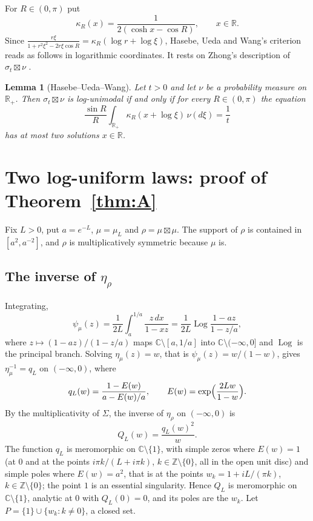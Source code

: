 \documentclass[11pt]{amsart}
\newtheorem{lemma}[theorem]{Lemma}
\theoremstyle{remark}
\newcommand{\R}{\mathbb R}
\newcommand{\C}{\mathbb C}
\newcommand{\Z}{\mathbb Z}
\newcommand{\Rp}{\R_{+}}
\DeclareMathOperator{\Log}{Log}
\begin{document}
For $R\in(0,\pi)$ put
\[
\kappa_R(x)=\frac{1}{2(\cosh x-\cos R)},\qquad x\in\R .
\]
Since $\frac{r\xi}{1+r^2\xi^2-2r\xi\cos R}=\kappa_R(\log r+\log\xi)$, Hasebe, Ueda and Wang's criterion \cite[Lemma~4.1, (1)$\Leftrightarrow$(3)]{HUW} reads as follows in logarithmic coordinates. It rests on Zhong's description of $\sigma_t\boxtimes\nu$ \cite{Zho15}.

\begin{lemma}[Hasebe--Ueda--Wang]\label{lem:huw}
Let $t>0$ and let $\nu$ be a probability measure on $\Rp$. Then $\sigma_t\boxtimes\nu$ is log-unimodal if and only if for every $R\in(0,\pi)$ the equation
\begin{equation}\label{eq:huw}
\frac{\sin R}{R}\int_{\Rp}\kappa_R(x+\log\xi)\,\nu(d\xi)=\frac1t
\end{equation}
has at most two solutions $x\in\R$.
\end{lemma}

\section{Two log-uniform laws: proof of \texorpdfstring{Theorem~\ref{thm:A}}{Theorem A}}\label{sec:A}

Fix $L>0$, put $a=e^{-L}$, $\mu=\mu_L$ and $\rho=\mu\boxtimes\mu$. The support of $\rho$ is contained in $[a^2,a^{-2}]$, and $\rho$ is multiplicatively symmetric because $\mu$ is.

\subsection{The inverse of \texorpdfstring{$\eta_\rho$}{eta}}
Integrating,
\[
\psi_\mu(z)=\frac1{2L}\int_a^{1/a}\frac{z\,dx}{1-xz}=\frac1{2L}\Log\frac{1-az}{1-z/a},
\]
where $z\mapsto(1-az)/(1-z/a)$ maps $\C\setminus[a,1/a]$ into $\C\setminus(-\infty,0]$ and $\Log$ is the principal branch. Solving $\eta_\mu(z)=w$, that is $\psi_\mu(z)=w/(1-w)$, gives $\eta_\mu^{-1}=q_L$ on $(-\infty,0)$, where
\[
q_L(w)=\frac{1-E(w)}{a-E(w)/a},\qquad E(w)=\exp\Bigl(\frac{2Lw}{1-w}\Bigr).
\]
By the multiplicativity of $\Sigma$, the inverse of $\eta_\rho$ on $(-\infty,0)$ is
\begin{equation}\label{eq:QL}
Q_L(w)=\frac{q_L(w)^2}{w}.
\end{equation}
The function $q_L$ is meromorphic on $\C\setminus\{1\}$, with simple zeros where $E(w)=1$ (at $0$ and at the points $i\pi k/(L+i\pi k)$, $k\in\Z\setminus\{0\}$, all in the open unit disc) and simple poles where $E(w)=a^2$, that is at the points $w_k=1+iL/(\pi k)$, $k\in\Z\setminus\{0\}$; the point $1$ is an essential singularity. Hence $Q_L$ is meromorphic on $\C\setminus\{1\}$, analytic at $0$ with $Q_L(0)=0$, and its poles are the $w_k$. Let $P=\{1\}\cup\{w_k:k\ne0\}$, a closed set.
\end{document}
